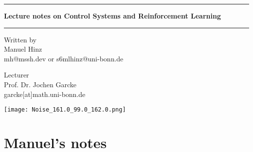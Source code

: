 \documentclass[a4paper, 10pt, oneside]{book}
\author{Manuel Hinz}
\begin{document}
\pagecolor{mycolor}
\begin{titlepage}
    \centering

    \vspace*{1cm}

    {\color{white}\rule{\textwidth}{1pt}}

    \vspace{.7\baselineskip}
    {\huge {\color{white}\textbf{Lecture notes on Control Systems and Reinforcement Learning}}}

    {\color{white}\rule{\textwidth}{1pt}}

    \vspace{1.5cm}

    \large

    \begin{minipage}{.5\textwidth}
        \color{white}
        \centering
        Written by \\
        Manuel Hinz\\
        {\normalsize mh@mssh.dev or s6mlhinz@uni-bonn.de}
    \end{minipage}%
    \begin{minipage}{.5\textwidth}
        \color{white}
        \centering
        Lecturer\\
        Prof. Dr. Jochen Garcke  \\
        {\normalsize garcke[at]math.uni-bonn.de}
    \end{minipage}


    \vspace{3cm}

    \texttt{[image: Noise\_161.0\_99.0\_162.0.png]}

    \vfill

    \color{white}{
    University of Bonn \\
    Summer semester 2025\\
    Last update: \today
    }
   
\end{titlepage}
\pagecolor{white}
\tableofcontents

\restoregeometry
\setcounter{chapter}{-1}
\chapter{Manuel's notes}



\end{document}
